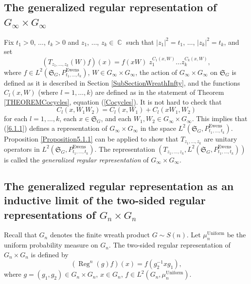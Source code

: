 \documentclass[12pt]{amsart}
\theoremstyle{definition}
\numberwithin{equation}{section}
\DeclareMathOperator{\C}{\mathbb{C}}
\DeclareMathOperator{\Ewens}{Ewens}
\DeclareMathOperator{\Uniform}{Uniform}
\DeclareMathOperator{\Reg}{Reg}
\begin{document}
\subsection{The generalized regular representation of $G_{\infty}\times G_{\infty}$}
\label{SectionTz1z2}
Fix $t_1>0$, $\ldots$, $t_k>0$ and $z_1$, $\ldots$, $z_k\in\C$ such that $|z_1|^2=t_1$, $\ldots$, $|z_k|^2=t_k$, and set
\begin{equation}\label{6.1.1}
\left(T_{z_1,\ldots,z_k}\left(W\right)f\right)(x)=f(xW)\;z_1^{C_1\left(x,W\right)}\ldots z_k^{C_k\left(x,W\right)},
\end{equation}
where $f\in L^{2}\left(\mathfrak{S}_{G}, P_{t_1,\ldots,t_k}^{\Ewens}\right)$, $W\in G_{\infty}\times G_{\infty}$,
the action of $G_{\infty}\times G_{\infty}$ on $\mathfrak{S}_G$ is defined as it is described in Section \ref{SubSectionWreathInfty}, and the functions $C_l\left(x,W\right)$ (where $l=1,\ldots,k$) are defined as in the statement of Theorem
\ref{THEOREMCocycles}, equation (\ref{Cocycles}). It is not hard to check that
$$
C_l\left(x,W_1W_2\right)=C_l\left(x,W_1\right)+C_l\left(xW_1,W_2\right)
$$
for each $l=1,\ldots,k$, each $x\in\mathfrak{S}_G$, and each $W_1, W_2\in G_{\infty}\times G_{\infty}$.
This implies that (\ref{6.1.1}) defines a representation of $G_{\infty}\times G_{\infty}$ in the space $L^2\left(\mathfrak{S}_G, P_{t_1,\ldots,t_k}^{\Ewens}\right)$.  Proposition \ref{Proposition5.1.1} can be applied to show that
$T_{z_1,\ldots,z_k}$ are unitary operators in $L^2\left(\mathfrak{S}_G, P_{t_1,\ldots,t_k}^{\Ewens}\right)$.
The representation $\left(T_{z_1,\ldots,z_k}, L^2\left(\mathfrak{S}_G, P_{t_1,\ldots,t_k}^{\Ewens}\right)\right)$ is called the \textit{generalized regular representation} of $G_{\infty}\times G_{\infty}$.

\subsection{The generalized regular representation as an inductive limit of the two-sided regular representations of $G_n\times G_{n}$}\label{Section6}
Recall that $G_n$ denotes the finite wreath product $G\sim S(n)$.
Let $\mu_n^{\Uniform}$ be the uniform probability measure on $G_n$. The two-sided regular representation of $G_n\times G_n$ is defined by
$$
\left(\Reg^n(g)f\right)(x)=f\left(g_2^{-1}xg_1\right),
$$
where $g=\left(g_1,g_2\right)\in G_n\times G_n$, $x\in G_n$, $f\in L^2\left(G_n,\mu_n^{\Uniform}\right)$.
\end{document}
